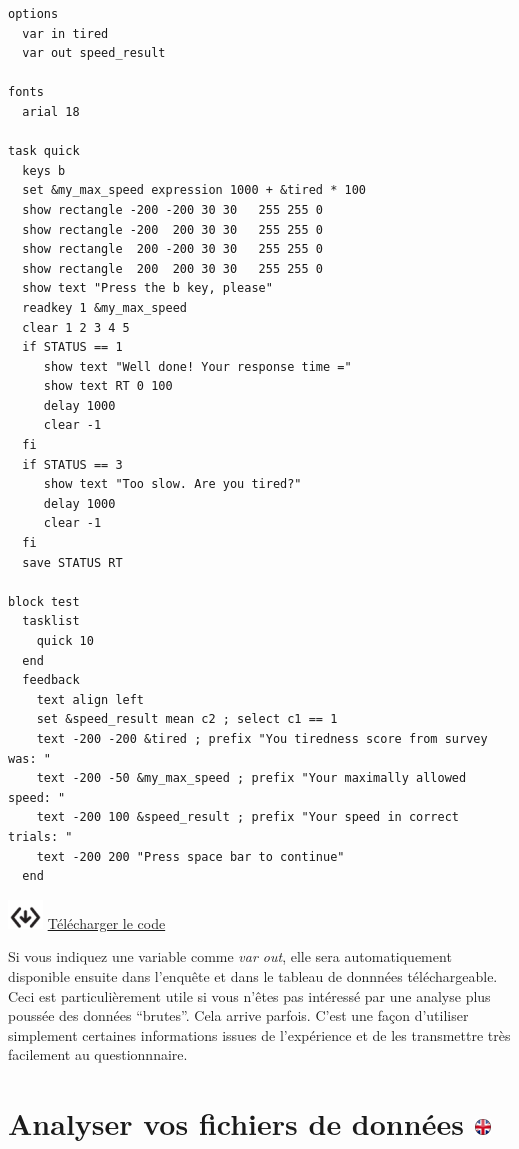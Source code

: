 \documentclass[
]{book}
\begin{document}
\begin{verbatim}
options
  var in tired
  var out speed_result

fonts
  arial 18

task quick
  keys b
  set &my_max_speed expression 1000 + &tired * 100
  show rectangle -200 -200 30 30   255 255 0
  show rectangle -200  200 30 30   255 255 0
  show rectangle  200 -200 30 30   255 255 0
  show rectangle  200  200 30 30   255 255 0
  show text "Press the b key, please"
  readkey 1 &my_max_speed
  clear 1 2 3 4 5
  if STATUS == 1
     show text "Well done! Your response time ="
     show text RT 0 100
     delay 1000
     clear -1
  fi
  if STATUS == 3
     show text "Too slow. Are you tired?"
     delay 1000
     clear -1
  fi
  save STATUS RT

block test
  tasklist
    quick 10
  end
  feedback
    text align left
    set &speed_result mean c2 ; select c1 == 1
    text -200 -200 &tired ; prefix "You tiredness score from survey was: "
    text -200 -50 &my_max_speed ; prefix "Your maximally allowed speed: "
    text -200 100 &speed_result ; prefix "Your speed in correct trials: "
    text -200 200 "Press space bar to continue"
  end
\end{verbatim}

\includegraphics{img/codedownload.png}
\href{https://www.psytoolkit.org/lessons/speed_measure.zip}{Télécharger
le code}

Si vous indiquez une variable comme \emph{var out}, elle sera
automatiquement disponible ensuite dans l'enquête et dans le tableau de
donnnées téléchargeable. Ceci est particulièrement utile si vous n'êtes
pas intéressé par une analyse plus poussée des données ``brutes''. Cela
arrive parfois. C'est une façon d'utiliser simplement certaines
informations issues de l'expérience et de les transmettre très
facilement au questionnnaire.

\hypertarget{analyser-vos-fichiers-de-donnuxe9es}{%
\chapter[Analyser vos fichiers de données ]{\texorpdfstring{Analyser vos
fichiers de données
\href{https://www.psytoolkit.org/doc3.1.0/analyze_data.html}{\protect\includegraphics{img/ukflag.png}}}{Analyser vos fichiers de données }}\label{analyser-vos-fichiers-de-donnuxe9es}}
\end{document}
